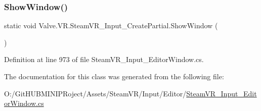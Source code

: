 \subsubsection{\texorpdfstring{ShowWindow()}{ShowWindow()}}
{\footnotesize\ttfamily static void Valve.\+V\+R.\+Steam\+V\+R\+\_\+\+Input\+\_\+\+Create\+Partial.\+Show\+Window (\begin{DoxyParamCaption}{ }\end{DoxyParamCaption})\hspace{0.3cm}{\ttfamily [static]}}



Definition at line 973 of file Steam\+V\+R\+\_\+\+Input\+\_\+\+Editor\+Window.\+cs.



The documentation for this class was generated from the following file\+:\begin{DoxyCompactItemize}
\item 
O\+:/\+Git\+H\+U\+B\+M\+I\+N\+I\+P\+Roject/\+Assets/\+Steam\+V\+R/\+Input/\+Editor/\mbox{\hyperlink{_steam_v_r___input___editor_window_8cs}{Steam\+V\+R\+\_\+\+Input\+\_\+\+Editor\+Window.\+cs}}\end{DoxyCompactItemize}
